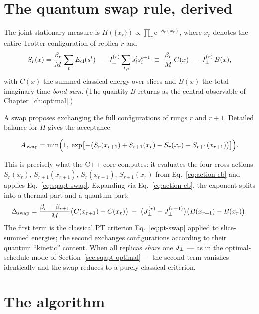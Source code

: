 \section{The quantum swap rule, derived}
\label{sec:quantum-swap}

The joint stationary measure is
$\Pi(\{x_r\})\propto\prod_r\mathrm{e}^{-S_r(x_r)}$, where $x_r$ denotes the
entire Trotter configuration of replica $r$ and
\begin{equation}
S_r(x)=\frac{\beta_r}{M}\sum_{t}E_{\mathrm{cl}}(s^t)\;-\;J_{\perp}^{(r)}\sum_{t,i}s^t_i s^{t+1}_i
\;\equiv\;\frac{\beta_r}{M}\,C(x)\;-\;J_{\perp}^{(r)}\,B(x),
\label{eq:action-cb}
\end{equation}
with $C(x)$ the summed classical energy over slices and $B(x)$ the total
imaginary-time \emph{bond sum}. (The quantity $B$ returns as the central
observable of Chapter~\ref{ch:optimal}.)

A swap proposes exchanging the full configurations of rungs $r$ and $r{+}1$.
Detailed balance for $\Pi$ gives the acceptance

\begin{keyeq}
\begin{equation}
A_{\text{swap}}=\min\Bigl(1,\;
\exp\bigl[-\bigl(S_r(x_{r+1})+S_{r+1}(x_r)-S_r(x_r)-S_{r+1}(x_{r+1})\bigr)\bigr]\Bigr).
\label{eq:sqapt-swap}
\end{equation}
\end{keyeq}

This is precisely what the C++ core computes: it evaluates the four
cross-actions $S_r(x_r)$, $S_{r+1}(x_{r+1})$, $S_r(x_{r+1})$,
$S_{r+1}(x_r)$ from Eq.~\eqref{eq:action-cb} and applies
Eq.~\eqref{eq:sqapt-swap}. Expanding via Eq.~\eqref{eq:action-cb}, the
exponent splits into a thermal part and a quantum part:
\begin{equation}
\Delta_{\text{swap}}
=\frac{\beta_{r}-\beta_{r+1}}{M}\bigl(C(x_{r+1})-C(x_{r})\bigr)
\;-\;\bigl(J_{\perp}^{(r)}-J_{\perp}^{(r+1)}\bigr)\bigl(B(x_{r+1})-B(x_{r})\bigr).
\label{eq:swap-split}
\end{equation}
The first term is the classical PT criterion Eq.~\eqref{eq:pt-swap} applied
to slice-summed energies; the second exchanges configurations according to
their quantum ``kinetic'' content. When all replicas \emph{share} one
$J_{\perp}$ --- as in the optimal-schedule mode of
Section~\ref{sec:sqapt-optimal} --- the second term vanishes identically and
the swap reduces to a purely classical criterion.

\section{The algorithm}

